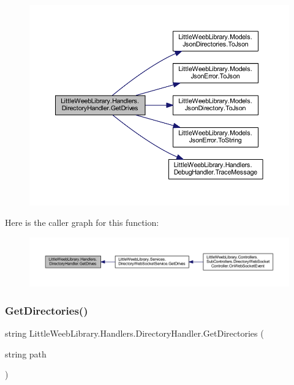 \begin{figure}[H]
\begin{center}
\leavevmode
\includegraphics[width=350pt]{class_little_weeb_library_1_1_handlers_1_1_directory_handler_a6ab9fa9b838eeca3f918429af0a3564d_cgraph}
\end{center}
\end{figure}
Here is the caller graph for this function\+:\nopagebreak
\begin{figure}[H]
\begin{center}
\leavevmode
\includegraphics[width=350pt]{class_little_weeb_library_1_1_handlers_1_1_directory_handler_a6ab9fa9b838eeca3f918429af0a3564d_icgraph}
\end{center}
\end{figure}
\mbox{\label{class_little_weeb_library_1_1_handlers_1_1_directory_handler_aa9d1414a83cadcf99da2cad30f39b2e3}} 
\subsubsection{\texorpdfstring{Get\+Directories()}{GetDirectories()}}
{\footnotesize\ttfamily string Little\+Weeb\+Library.\+Handlers.\+Directory\+Handler.\+Get\+Directories (\begin{DoxyParamCaption}\item[{string}]{path }\end{DoxyParamCaption})}



